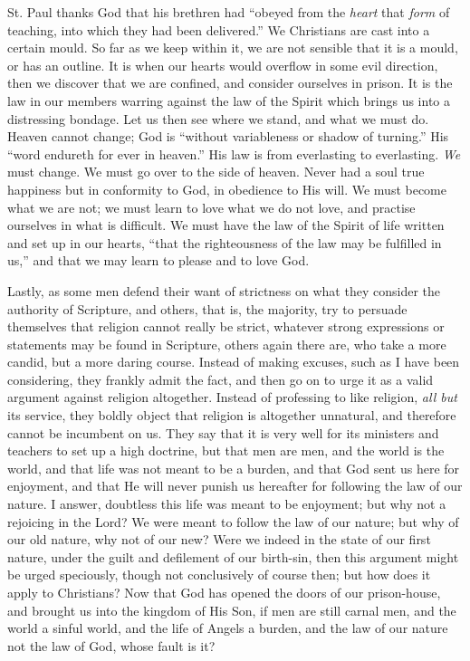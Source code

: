 St. Paul thanks God that his brethren had ``obeyed from the \emph{heart}
that \emph{form} of teaching, into which they had been
delivered.'' We Christians are cast into a certain mould. So far
as we keep within it, we are not sensible that it is a mould, or has
an outline. It is when our hearts would overflow in some evil
direction, then we discover that we are confined, and consider
ourselves in prison. It is the law in our members warring against the
law of the Spirit which brings us into a distressing bondage. Let us
then see where we stand, and what we must do. Heaven cannot change;
God is ``without variableness or shadow of turning.'' His
``word endureth for ever in heaven.'' His law is from
everlasting to everlasting. \emph{We} must change. We must go over to
the side of heaven. Never had a soul true happiness but in conformity
to God, in obedience to His will. We must become what we are not; we
must learn to love what we do not love, and practise ourselves in what
is difficult. We must have the law of the Spirit of life written and
set up in our hearts, ``that the righteousness of the law may be
fulfilled in us,'' and that we may learn to please and to love
God.

Lastly, as some men defend their want of strictness on what they
consider the authority of Scripture, and others, that is, the
majority, try to persuade themselves that religion cannot really be
strict, whatever strong expressions or statements may be found in
Scripture, others again there are, who take a more candid, but a more
daring course. Instead of making excuses, such as I have been
considering, they frankly admit the fact, and then go on to urge it as
a valid argument against religion altogether. Instead of professing to
like religion, \emph{all but} its service, they boldly object that
religion is altogether unnatural, and therefore cannot be incumbent on
us. They say that it is very well for its ministers and teachers to
set up a high doctrine, but that men are men, and the world is the
world, and that life was not meant to be a burden, and that God sent
us here for enjoyment, and that He will never punish us hereafter for
following the law of our nature. I answer, doubtless this life was
meant to be enjoyment; but why not a rejoicing in the Lord? We were
meant to follow the law of our nature; but why of our old nature, why
not of our new? Were we indeed in the state of our first nature, under
the guilt and defilement of our birth-sin, then this argument might be
urged speciously, though not conclusively of course then; but how does
it apply to Christians? Now that God has opened the doors of our
prison-house, and brought us into the kingdom of His Son, if men are
still carnal men, and the world a sinful world, and the life of Angels
a burden, and the law of our nature not the law of God, whose fault is
it?

